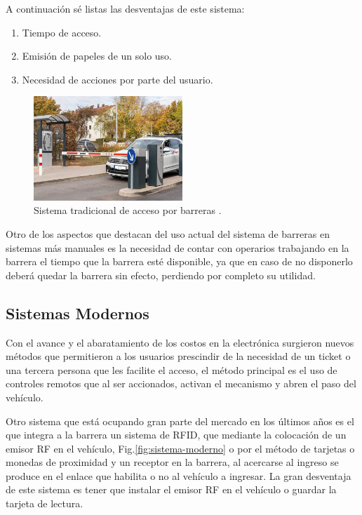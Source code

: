 A continuación sé listas las desventajas de este sistema:

\begin{enumerate}
    \item Tiempo de acceso.
    \item Emisión de papeles de un solo uso.
    \item Necesidad de acciones por parte del usuario.
\end{enumerate}

\begin{figure}
    \centering
    \includegraphics[width=0.5\textwidth]{imgs/sistema-control-acceso-barreras.jpg}
    \caption{Sistema tradicional de acceso por barreras \cite{integralia_sistema_2019}.}
    \label{fig:sistema-tradicional}
\end{figure}

Otro de los aspectos que destacan del uso actual del sistema de barreras en sistemas más manuales es la necesidad de
contar con  operarios trabajando en la barrera el tiempo que la barrera esté disponible, ya que en caso de no disponerlo
deberá quedar la barrera sin efecto, perdiendo por completo su utilidad.

\subsection{Sistemas Modernos}

Con el avance y el abaratamiento de los costos en la electrónica surgieron nuevos métodos que permitieron a los usuarios prescindir de la necesidad de un ticket o una tercera persona que les facilite el acceso, el método principal es el uso de controles remotos que al ser accionados, activan el mecanismo y abren el paso del vehículo.

Otro sistema que está ocupando gran parte del mercado en los últimos años es el que integra a la barrera un sistema de RFID, que mediante la colocación de un emisor RF en el vehículo, Fig.\ref{fig:sistema-moderno} o por el método de tarjetas o monedas de proximidad y un receptor en la barrera, al acercarse al ingreso se produce en el enlace que habilita o no al vehículo a ingresar. La gran desventaja de este sistema es tener que instalar el emisor RF en el vehículo o guardar la tarjeta de lectura.

